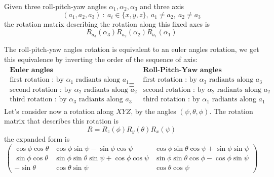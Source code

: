 \documentclass[10pt, letterpaper]{report}
\begin{document}
\begin{definition}
    Given three roll-pitch-yaw angles $\alpha_1,\alpha_2,\alpha_3$ and three axis $$(a_1,a_2,a_3)  \ : \ a_i\in \{x,y,z\}, \ a_1\ne a_{2}, \ a_2\ne a_3
    $$
    the rotation matrix describing the rotation along this fixed axes is\begin{equation}
        R_{a_3}(\alpha_3) R_{a_2}(\alpha_2) R_{a_1}(\alpha_1)
    \end{equation}
\end{definition}
The roll-pitch-yaw angles rotation is equivalent to an euler angles rotation, we get this equivalence by inverting the order of the sequence of axis:$$\begin{matrix}
    \begin{matrix}
        \textbf{Euler angles}\\ 
        \text{first rotation :  by }\alpha_1\text{ radiants along }a_1\\ 
        \text{second rotation :  by }\alpha_2\text{ radiants along }a_2\\ 
        \text{third rotation :  by }\alpha_3\text{ radiants along }a_3
    \end{matrix}&
    \equiv
    & \begin{matrix}
        \textbf{Roll-Pitch-Yaw angles}\\ 
        \text{first rotation :  by }\alpha_3\text{ radiants along }a_3\\ 
        \text{second rotation :  by }\alpha_2\text{ radiants along }a_2\\ 
        \text{third rotation :  by }\alpha_1\text{ radiants along }a_1
    \end{matrix}
\end{matrix} $$
Let's consider now a rotation along $XYZ$, by the angles $(\psi,\theta,\phi)$. The rotation matrix that describes this rotation is\begin{equation}
    R=R_z(\phi)R_y(\theta)R_x(\psi)  
\end{equation}
the expanded form is\begin{equation}\label{rpy_mat}
    \begin{pmatrix}
        \cos\phi\cos\theta&\cos\phi\sin\psi-\sin\phi\cos\psi&\cos\phi\sin\theta\cos\psi+\sin\phi\sin\psi\\ 
        \sin\phi\cos\theta&\sin\phi\sin\theta\sin\psi+\cos\phi\cos\psi&\sin\phi\sin\theta\cos\phi-\cos\phi\sin\psi\\ 
        -\sin\theta&\cos\theta\sin\psi&\cos\theta\cos\psi
    \end{pmatrix}
\end{equation}
\end{document}
